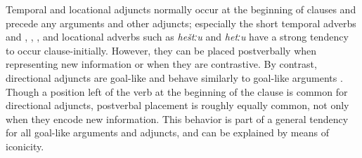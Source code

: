 Temporal and locational adjuncts normally occur at the beginning of clauses and precede any arguments and other adjuncts; especially the short temporal adverbs  and   , , , and locational adverbs such as \textit{heštːu}  and \textit{hetːu}  have a strong tendency to occur clause-initially. However, they can be placed postverbally when representing new information or when they are contrastive. By contrast, directional adjuncts are goal-like and behave similarly to goal-like arguments . Though a position left of the verb at the beginning of the clause is common for directional adjuncts, postverbal placement is roughly equally common, not only when they encode new information. This behavior is part of a general tendency for all goal-like arguments and adjuncts, and can be explained by means of iconicity.

